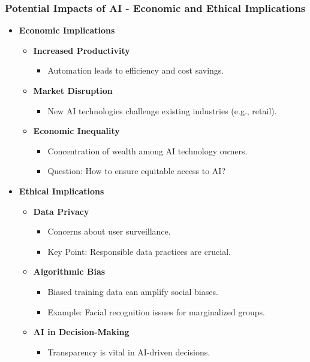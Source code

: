 \documentclass[aspectratio=169]{beamer}
\begin{document}
\begin{frame}[fragile]
    \frametitle{Potential Impacts of AI - Economic and Ethical Implications}
    \begin{itemize}
        \item \textbf{Economic Implications}
            \begin{itemize}
                \item \textbf{Increased Productivity}
                    \begin{itemize}
                        \item Automation leads to efficiency and cost savings.
                    \end{itemize}
                \item \textbf{Market Disruption}
                    \begin{itemize}
                        \item New AI technologies challenge existing industries (e.g., retail).
                    \end{itemize}
                \item \textbf{Economic Inequality}
                    \begin{itemize}
                        \item Concentration of wealth among AI technology owners. 
                        \item Question: How to ensure equitable access to AI?
                    \end{itemize}
            \end{itemize}
        \item \textbf{Ethical Implications}
            \begin{itemize}
                \item \textbf{Data Privacy}
                    \begin{itemize}
                        \item Concerns about user surveillance.
                        \item Key Point: Responsible data practices are crucial.
                    \end{itemize}
                \item \textbf{Algorithmic Bias}
                    \begin{itemize}
                        \item Biased training data can amplify social biases.
                        \item Example: Facial recognition issues for marginalized groups.
                    \end{itemize}
                \item \textbf{AI in Decision-Making}
                    \begin{itemize}
                        \item Transparency is vital in AI-driven decisions.
                    \end{itemize}
            \end{itemize}
    \end{itemize}
\end{frame}
\end{document}
